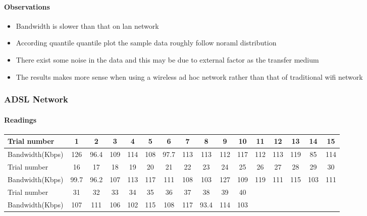 \documentclass[aps,letterpaper,10pt]{revtex4}
\begin{document}
            \paragraph{Observations}
                \begin{itemize}
                        \item Bandwidth is slower than that on lan network 
                        \item According quantile quantile plot the sample data roughly follow noraml distribution
                        \item There exist some noise in the data and this may be due to external factor as the transfer medium
                        \item The results makes more sense when using a wireless ad hoc network rather than that of traditional wifi network
                \end{itemize}
        \newpage        
        \subsubsection{ADSL Network}
            \paragraph{Readings}
                \begin{center}
                    \begin{tabular}{ ||l || c | c | c | c | c | c | c | c | c | c | c | c | c | c | c | }
                    \hline
                    Trial number & 1 & 2 & 3 & 4 & 5 & 6 & 7 & 8 & 9 & 10 & 11 & 12 & 13 & 14 & 15 \\ \hline
                    Bandwidth(Kbps) & 126 & 96.4 & 109 & 114 & 108 & 97.7 & 113 & 113 & 112 & 117 & 112 & 113 & 119 & 85 & 114  \\
                    \hline   
                    \hline
                    Trial number & 16 & 17 & 18 & 19 & 20 & 21 & 22 & 23 & 24 & 25 & 26 & 27 & 28 & 29 & 30 \\ \hline 
                    Bandwidth(Kbps) & 99.7 & 96.2 & 107 & 113 & 117 & 111 & 108 & 103 & 127 & 109 & 119 & 111 & 115 & 103 & 111  \\ \hline    
                    \hline
                    Trial number & 31 & 32 & 33 & 34 & 35 & 36 & 37 & 38 & 39 & 40 & & & & & \\ \hline
                    Bandwidth(Kbps) & 107 & 111 & 106 & 102 & 115 & 108 & 117 & 93.4 & 114 & 103 & & & & &\\
                    \hline
                    \end{tabular}
                \end{center}
                \vspace{3mm}
\end{document}
